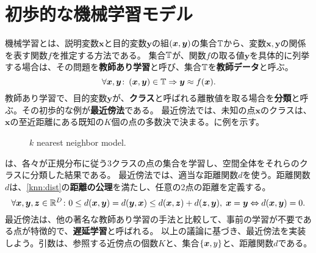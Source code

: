 \documentclass[10pt,a4paper]{book}
\begin{document}
\maketitle
\tableofcontents

\chapter{初歩的な機械学習モデル\label{chap:intro}}

機械学習とは、説明変数$\bm{x}$と目的変数$\bm{y}$の組$\XY$の集合$\mathbb{T}$から、変数$\bm{x},\bm{y}$の関係を表す関数$f$を推定する方法である。
集合$\mathbb{T}$が、関数$f$の取る値$\bm{y}$を具体的に列挙する場合は、その問題を\textbf{教師あり学習}と呼び、集合$\mathbb{T}$を\textbf{教師データ}と呼ぶ。
%
\begin{equation}
\forall\bm{x},\bm{y}\colon \pair{\bm{x}}{\bm{y}}\in\TRAIN \Rightarrow \bm{y} \approx f(\bm{x}).
\end{equation}
%
教師あり学習で、目的変数$\bm{y}$が、\textbf{クラス}と呼ばれる離散値を取る場合を\textbf{分類}と呼ぶ。その初歩的な例が\textbf{最近傍法}である。
最近傍法では、未知の点$\bm{x}$のクラスは、$\bm{x}$の至近距離にある既知の$K$個の点の多数決で決まる。に例を示す。

\begin{figure}[h]
\centering
{}
\caption{$k$ nearest neighbor model.\label{fig:knn}}
\end{figure}

は、各々が正規分布に従う3クラスの点の集合を学習し、空間全体をそれらのクラスに分類した結果である。
最近傍法では、適当な距離関数$d$を使う。距離関数$d$は、\eqref{knn:dist}の\textbf{距離の公理}を満たし、任意の2点の距離を定義する。
%
\begin{equation}
\label{eq:knn:dist}
\forall \bm{x},\bm{y},\bm{z} \in \mathbb{R}^D \colon
0 \leq d(\bm{x},\bm{y}) = d(\bm{y},\bm{x}) \leq d(\bm{x},\bm{z}) + d(\bm{z},\bm{y}),\;
\bm{x} = \bm{y} \Leftrightarrow d(\bm{x},\bm{y}) = 0.
\end{equation}
%
最近傍法は、他の著名な教師あり学習の手法と比較して、事前の学習が不要である点が特徴的で、\textbf{遅延学習}と呼ばれる。
以上の議論に基づき、最近傍法を実装しよう。引数は、参照する近傍点の個数$K$と、集合$\seq{\bm{x},y}$と、距離関数$d$である。
\end{document}

